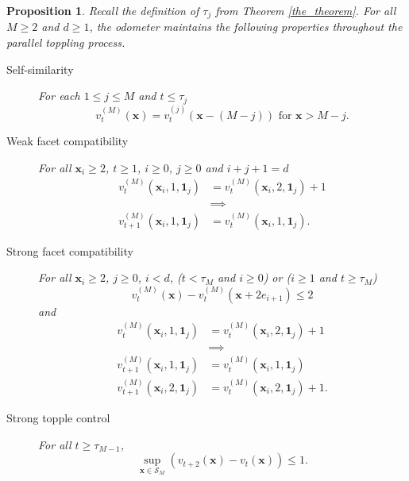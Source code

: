 \documentclass[12pt]{amsart}
\newtheorem{prop}{Proposition}[section]
\begin{document}
	
	\begin{prop}\label{base_dimension}
		Recall the definition of $\tau_{j}$ from Theorem \ref{the_theorem}. For all $M \geq 2$ and $d \geq 1$, the odometer maintains the following properties throughout the parallel toppling process.
		\begin{description}
			\item[Self-similarity]  For each $1 \leq j \leq M$ and $t \leq \tau_j$ 
			\begin{equation} \label{base_dimension:consistency}
			v_t^{(M)}(\mathbf{x}) =  v_t^{(j)}(\mathbf{x}-(M-j))  \mbox{ for $\mathbf{x} > M-j$}.
			\end{equation}
			\item[Weak facet compatibility] For all $\mathbf{x}_i \geq 2$, $t \geq 1$, $i \geq 0$, $j \geq 0$ and $i+j+1=d$
			\begin{equation} \label{base_dimension:weak_compatability}
			\begin{aligned}
			v_t^{(M)}(\mathbf{x}_i, 1, \mathbf{1}_j) &= v_t^{(M)}(\mathbf{x}_i, 2, \mathbf{1}_j)+ 1  \\
			& \implies \\
			v_{t+1}^{(M)}(\mathbf{x}_i, 1, \mathbf{1}_j) &= v_{t}^{(M)}(\mathbf{x}_i, 1, \mathbf{1}_j).
			\end{aligned} 
			\end{equation}
			\item[Strong facet compatibility] For all $\mathbf{x}_i \geq 2$, $j \geq 0$, $i < d$, 
			($t < \tau_M$ and $i \geq 0$) or ($i \geq 1$ and $t \geq \tau_M$)
			\begin{equation} \label{base_dimension:strong_derivative}
			v_t^{(M)}(\mathbf{x}) - v_t^{(M)}(\mathbf{x} + 2 e_{i+1}) \leq 2
			\end{equation}
			and
			\begin{equation} \label{base_dimension:strong_compatability}
			\begin{aligned} 
			v_t^{(M)}(\mathbf{x}_i, 1, \mathbf{1}_j) &= v_t^{(M)}(\mathbf{x}_i, 2, \mathbf{1}_j)+ 1 \\
			& \implies \\
			v_{t+1}^{(M)}(\mathbf{x}_i, 1, \mathbf{1}_j) &= v_{t}^{(M)}(\mathbf{x}_i, 1, \mathbf{1}_j) \\
			v_{t+1}^{(M)}(\mathbf{x}_i, 2, \mathbf{1}_j) &= v_{t}^{(M)}(\mathbf{x}_i, 2, \mathbf{1}_j)+1.
			\end{aligned}
			\end{equation}

		
			
			\item[Strong topple control] 
			For all $t \geq \tau_{M-1}$, 
			\begin{equation} \label{base_dimension:strong_topple}
			\sup_{\mathbf{x} \in \mathcal{S}_M} \left(v_{t+2}(\mathbf{x}) - v_{t}(\mathbf{x})\right) \leq 1.
			\end{equation}

			
		\end{description}
		
	\end{prop}
	
\end{document}
